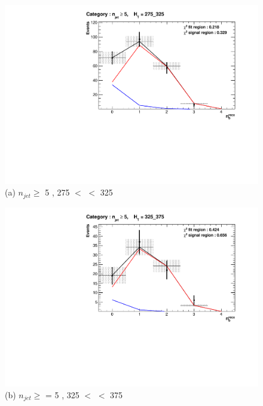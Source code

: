 \begin{figure}[ht]
\footnotesize
\centering
\begin{minipage}[b]{0.51 \linewidth}
\includegraphics[width = 1.0\linewidth]{plots/ThesisPlots/Final_Fit_To_Data_Normal_Medium_HTBin_OneMuon_275_325_jet_mult_5.pdf}
\centering (a) $n_{jet} \geq$  5 , 275 $<$ \theht $<$ 325
\end{minipage}
\quad
\begin{minipage}[b]{0.51\linewidth}
\includegraphics[width = 1.0\linewidth]{plots/ThesisPlots/Final_Fit_To_Data_Normal_Medium_HTBin_OneMuon_325_375_jet_mult_5.pdf}
\centering (b) $n_{jet} \geq$ = 5 , 325 $<$ \theht $<$ 375 
\end{minipage}
\quad
\begin{minipage}[b]{0.51\linewidth}
\centering

\end{minipage}
\end{figure}
